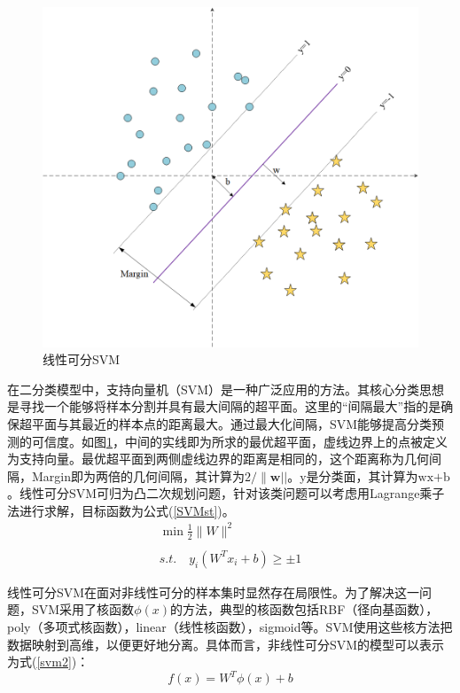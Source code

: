    \begin{figure}[htbp]
      \centering  
      \includegraphics[width=0.9\linewidth]{figs/svm.png}
      \caption{线性可分SVM}\label{svm}
    \end{figure}
    
在二分类模型中，支持向量机（SVM）是一种广泛应用的方法。其核心分类思想是寻找一个能够将样本分割并具有最大间隔的超平面。这里的“间隔最大”指的是确保超平面与其最近的样本点的距离最大。通过最大化间隔，SVM能够提高分类预测的可信度。如图\ref{svm}，中间的实线即为所求的最优超平面，虚线边界上的点被定义为支持向量。最优超平面到两侧虚线边界的距离是相同的，这个距离称为几何间隔，Margin即为两倍的几何间隔，其计算为$2/\|\mathbf{w}||$。y是分类面，其计算为$\text{wx+b}$。线性可分SVM可归为凸二次规划问题，针对该类问题可以考虑用Lagrange乘子法进行求解，目标函数为公式(\ref{SVMst})。
\begin{equation}\label{SVMst}
\begin{aligned}\min\frac{1}{2}\|W\|^2\\\\s.t.\quad y_i\left(W^Tx_i+b\right)\geq\pm1\end{aligned}
\end{equation}

线性可分SVM在面对非线性可分的样本集时显然存在局限性。为了解决这一问题，SVM采用了核函数$\phi(x)$的方法，典型的核函数包括RBF（径向基函数），poly（多项式核函数），linear（线性核函数），sigmoid等。SVM使用这些核方法把数据映射到高维，以便更好地分离。具体而言，非线性可分SVM的模型可以表示为式(\ref{svm2})：
\begin{equation}\label{svm2}
f(x)=W^{T}\phi(x)+b
\end{equation}

